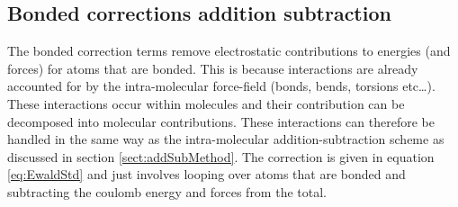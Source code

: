 \subsection{Bonded corrections addition subtraction}
The bonded correction terms remove electrostatic contributions to energies (and forces) for atoms that are bonded. This is because interactions are already accounted for by the intra-molecular force-field (bonds, bends, torsions etc\ldots). These interactions occur within molecules and their contribution can be decomposed into molecular contributions. These interactions can therefore be handled in the same way as the intra-molecular addition-subtraction scheme as discussed in section \ref{sect:addSubMethod}. The correction is given in equation \eqref{eq:EwaldStd} and just involves looping over atoms that are bonded and subtracting the coulomb energy and forces from the total.

